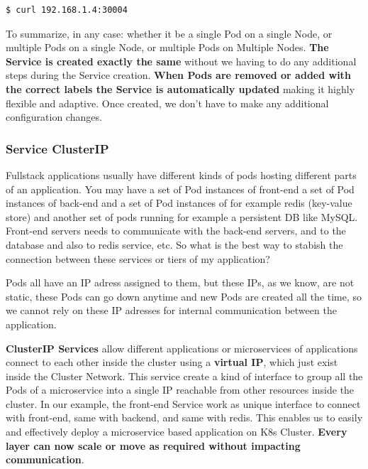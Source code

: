 \documentclass{article}
\newenvironment{codetemplate}[1][]{%
  \mybasecolorbox[#1]
  \itshape
}{%
  \endmybasecolorbox
}
\begin{document}
\begin{codetemplate}{}
\begin{verbatim}
$ curl 192.168.1.4:30004
\end{verbatim}
\end{codetemplate}

To summarize, in any case: whether it be a single Pod on a single Node, or multiple Pods on a single Node, or multiple Pods on Multiple Nodes. \textbf{The Service is created exactly the same} without we having to do any additional steps during the Service creation. \textbf{When Pods are removed or added with the correct labels the Service is automatically updated} making it highly flexible and adaptive. Once created, we don't have to make any additional configuration changes.

\subsubsection{Service ClusterIP}

Fullstack applications usually have different kinds of pods hosting different parts of an application. 
You may have a set of Pod instances of front-end a set of Pod instances of back-end and
a set of Pod instances of for example redis (key-value store) and another 
set of pods running for example a persistent DB like MySQL. 
Front-end servers needs to communicate with the back-end servers, 
and to the database and also to redis service, etc. So what is the best way to stabish the connection between these services or tiers of my application? 

Pods all have an IP adress assigned to them, but these IPs, as we know, are not static, these Pods can go down anytime and new Pods are created all the time, 
so we cannot rely on these IP adresses for internal communication between the application.

\textbf{ClusterIP Services} allow different applications or microservices of applications connect to each other inside the cluster using a \textbf{virtual IP}, which just exist inside the Cluster Network. 
This service create a kind of interface to group all the Pods of a microservice 
into a single IP reachable from other resources inside the cluster. 
In our example, the front-end Service work as unique interface to connect with front-end, same with backend, and same with redis. This enables us to easily and effectively deploy a microservice based application on K8s Cluster. \textbf{Every layer can now scale or move as required without impacting communication}.
\end{document}
